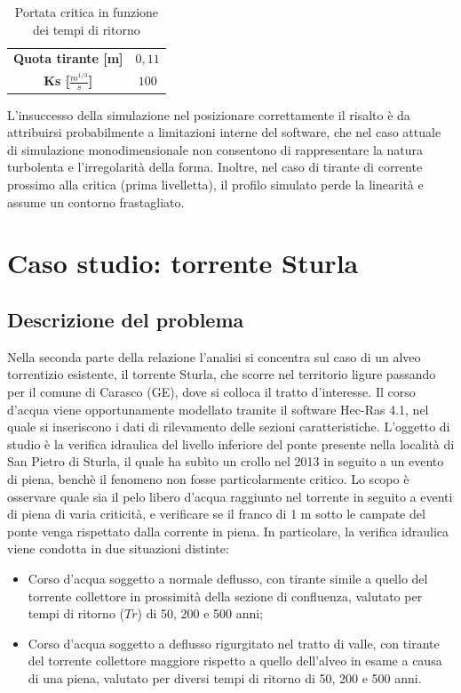 \documentclass[12pt]{article} %
\begin{document}
\begin{table}[H]
    \centering
    \begin{tabular}{|c|c|}
        \hline
        \textbf{Quota tirante [m]} & $0,11$ \\
        \textbf{Ks [$\frac{m^{1/3}}{s}$]} & $100$\\
        \hline
    \end{tabular}
    \caption{Portata critica in funzione dei tempi di ritorno}
\end{table}

\noindent L’insuccesso della simulazione nel posizionare correttamente il risalto è da attribuirsi probabilmente a limitazioni interne del software, che nel caso attuale di simulazione monodimensionale non consentono di rappresentare la natura turbolenta e l'irregolarità della forma. Inoltre, nel caso di tirante di corrente prossimo alla critica (prima livelletta), il profilo simulato perde la linearità e assume un contorno frastagliato.

\newpage

\section{Caso studio: torrente Sturla}
\subsection{Descrizione del problema}
\noindent Nella seconda parte della relazione l’analisi si concentra sul caso di un alveo torrentizio esistente, il torrente Sturla, che scorre nel territorio ligure passando per il comune di Carasco (GE), dove si colloca il tratto d’interesse. Il corso d’acqua viene opportunamente modellato tramite il software Hec-Ras 4.1, nel quale si inseriscono i dati di rilevamento delle sezioni caratteristiche.
L’oggetto di studio è la verifica idraulica del livello inferiore del ponte presente nella località di San Pietro di Sturla, il quale ha subìto un crollo nel 2013 in seguito a un evento di piena, benchè il fenomeno non fosse particolarmente critico. Lo scopo è osservare quale sia il pelo libero d’acqua raggiunto nel torrente in seguito a eventi di piena di varia criticità, e verificare se il franco di 1 m sotto le campate del ponte venga rispettato dalla corrente in piena.
In particolare, la verifica idraulica viene condotta in due situazioni distinte:

\begin{itemize}
    \item Corso d'acqua soggetto a normale deflusso, con tirante simile a quello del torrente collettore in prossimità della sezione di confluenza, valutato per tempi di ritorno ($Tr$) di 50, 200 e 500 anni;
    \item Corso d'acqua soggetto a deflusso rigurgitato nel tratto di valle, con tirante del torrente collettore maggiore rispetto a quello dell'alveo in esame a causa di una piena, valutato per diversi tempi di ritorno di 50, 200 e 500 anni.
\end{itemize}
\end{document}

